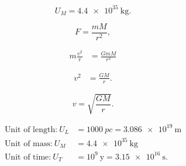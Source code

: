 \documentclass[a4paper,twoside,12pt,hidelinks]{article}
\begin{document}
\[
U_M = \SI{4.4e35}{\kg}.
\]


\[
F = \frac{m M}{r^2},
\]

\begin{align*}
    m \frac{v^2}{r} &= \frac{G m M}{r^2}
\end{align*}

\begin{align*}
    v^2 &= \frac{G M}{r}.
\end{align*}


\[
v = \sqrt{\frac{G M}{r}}.
\]

\begin{align*}
    \text{Unit of length:} \ U_L &= \SI{1000}{pc} = \SI{3.086e19}{\m} \\
    \text{Unit of mass:} \ U_M &= \SI{4.4e35}{\kg} \\
    \text{Unit of time:} \ U_T &= 10^9 \ \text{y} = \SI{3.15e16}{\s}.
\end{align*}
\end{document}
